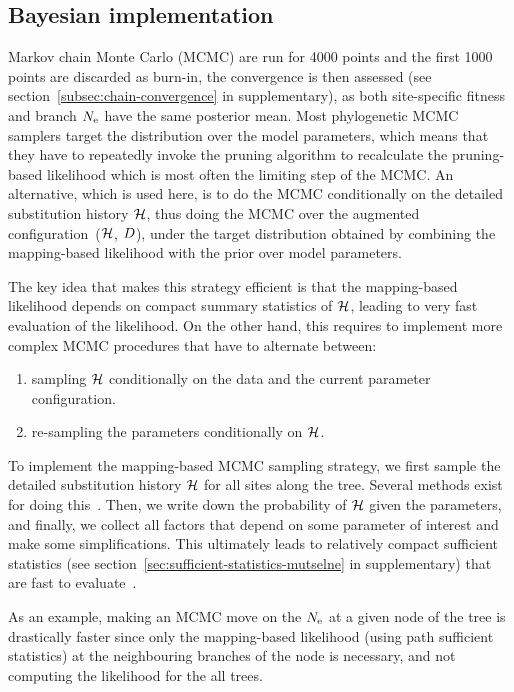 \subsection{Bayesian implementation}
\label{sec:Bayesian}
Markov chain Monte Carlo (\acrshort{MCMC}) are run for 4000 points and the first 1000 points are discarded as burn-in, the convergence is then assessed (see section~\ref{subsec:chain-convergence} in supplementary), as both site-specific fitness and branch $N_{\text{e}}$ have the same \gls{posterior} mean.
Most phylogenetic \acrshort{MCMC} samplers target the distribution over the model parameters, which means that they have to repeatedly invoke the pruning algorithm to recalculate the pruning-based \gls{likelihood} which is most often the limiting step of the \acrshort{MCMC}.
An alternative, which is used here, is to do the \acrshort{MCMC} conditionally on the detailed \gls{substitution} history $\mathcal{H}$, thus doing the \acrshort{MCMC} over the augmented configuration~($\mathcal{H}$, $D$), under the target distribution obtained by combining the mapping-based \gls{likelihood} with the \gls{prior} over model parameters.

The key idea that makes this strategy efficient is that the mapping-based \gls{likelihood} depends on compact summary statistics of $\mathcal{H}$, leading to very fast evaluation of the \gls{likelihood}.
On the other hand, this requires to implement more complex \acrshort{MCMC} procedures that have to alternate between:
\begin{enumerate}
    \item sampling $\mathcal{H}$ conditionally on the data and the current parameter configuration.
    \item re-sampling the parameters conditionally on $\mathcal{H}$.
\end{enumerate}

To implement the mapping-based \acrshort{MCMC} sampling strategy, we first sample the detailed \gls{substitution} history $\mathcal{H}$ for all sites along the tree.
Several methods exist for doing this~\citep{Nielsen2002,Rodrigue2008}.
Then, we write down the probability of $\mathcal{H}$ given the parameters, and finally, we collect all factors that depend on some parameter of interest and make some simplifications.
This ultimately leads to relatively compact sufficient statistics (see section~\ref{sec:sufficient-statistics-mutselne} in supplementary) that are fast to evaluate~\citep{Irvahn2014,Davydov2016}.

As an example, making an \acrshort{MCMC} move on the $N_{\text{e}}$ at a given node of the tree is drastically faster since only the mapping-based \gls{likelihood} (using path sufficient statistics) at the neighbouring branches of the node is necessary, and not computing the \gls{likelihood} for the all trees.

